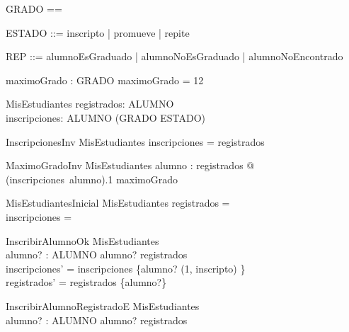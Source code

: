 \begin{zed}
    [ALUMNO]
\end{zed}
\begin{zed}
    GRADO == \nat
\end{zed}
\begin{zed}
    ESTADO ::= inscripto | promueve | repite
\end{zed}
\begin{zed}
    REP ::= alumnoEsGraduado | alumnoNoEsGraduado | alumnoNoEncontrado
\end{zed}

\begin{axdef}
    maximoGrado : GRADO
\where
    maximoGrado = 12
\end{axdef}

\begin{schema}{MisEstudiantes}
    registrados: \power ALUMNO \\
    inscripciones: ALUMNO \pfun (GRADO \cross ESTADO)
\end{schema}

\begin{schema}{InscripcionesInv}
    MisEstudiantes
    \where
    \dom inscripciones = registrados
\end{schema}

\begin{schema}{MaximoGradoInv}
    MisEstudiantes
    \where
    \forall alumno : registrados @ (inscripciones~alumno).1 \leq maximoGrado
\end{schema}

\begin{schema}{MisEstudiantesInicial}
    MisEstudiantes
    \where
    registrados = \emptyset \\
    inscripciones = \emptyset
\end{schema}

\begin{schema}{InscribirAlumnoOk}
    \Delta MisEstudiantes \\
    alumno? : ALUMNO
    \where
    alumno? \notin registrados \\
    inscripciones' = inscripciones \cup \{alumno? \mapsto (1, inscripto) \} \\
    registrados' = registrados \cup \{alumno?\}
\end{schema}

\begin{schema}{InscribirAlumnoRegistradoE}
    \Xi MisEstudiantes \\
    alumno? : ALUMNO
    \where
    alumno? \in registrados
\end{schema}

